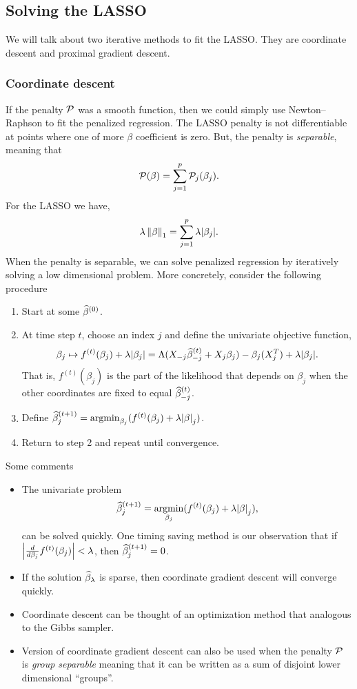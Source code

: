 \subsection{Solving the LASSO}
We will talk about two iterative methods to fit the LASSO. They are coordinate descent and proximal gradient descent.
\subsubsection{Coordinate descent}
If the penalty ${\mathcal{P}}$ was a smooth function, then we could simply use Newton--Raphson to fit the penalized regression. The LASSO penalty is not differentiable at points where one of more $\beta$ coefficient is zero. But, the penalty is \emph{separable}, meaning that 
\[{\mathcal{P}}(\beta) = \sum_{j=1}^p {\mathcal{P}}_j(\beta_j). \]
For the LASSO we have,
\[\lambda \left\|\beta\right\|_1 = \sum_{j=1}^p \lambda {\left\lvert\beta_j\right\rvert}. \]
When the penalty is separable, we can solve penalized regression by iteratively solving a low dimensional problem. More concretely, consider the following procedure
\begin{enumerate}
    \item Start at some $\widehat{\beta}^{(0)}$.
    \item At time step $t$, choose an index $j$ and define the univariate objective function,
    \[\beta_j \mapsto f^{(t)}(\beta_j)+\lambda{\left\lvert\beta_j\right\rvert} = \Lambda(X_{-j}\widehat{\beta}_{-j}^{(t)}+X_j\beta_j) -\beta_j(X_j^T)+\lambda {\left\lvert\beta_j\right\rvert}. \]
    That is, $f^{(t)}(\beta_j)$ is the part of the likelihood that depends on $\beta_j$ when the other coordinates are fixed to equal $\widehat{\beta}^{(t)}_{-j}$.
    \item Define $\widehat{\beta}^{(t+1)}_j = \operatorname*{argmin}_{\beta_j}(f^{(t)}(\beta_j)+\lambda{\left\lvert\beta\right\rvert}_j)$.
    \item Return to step 2 and repeat until convergence.
\end{enumerate}
Some comments
\begin{itemize}
    \item The univariate problem 
    \[ \widehat{\beta}^{(t+1)}_j = \operatorname*{argmin}_{\beta_j}(f^{(t)}(\beta_j)+\lambda{\left\lvert\beta\right\rvert}_j),\]
    can be solved quickly. One timing saving method is our observation that if ${\left\lvert\frac{d}{d\beta_j}f^{(t)}(\beta_j)\right\rvert} < \lambda$, then $\widehat{\beta}^{(t+1)}_j = 0$.
    \item  If the solution $\widehat{\beta}_\lambda$ is sparse,  then coordinate gradient descent will converge quickly.
    \item Coordinate descent can be thought of an optimization method that analogous to the Gibbs sampler.
    \item Version of coordinate gradient descent can also be used when the penalty ${\mathcal{P}}$ is \emph{group separable} meaning that it can be written as a sum of disjoint lower dimensional ``groups''. 
\end{itemize}  
